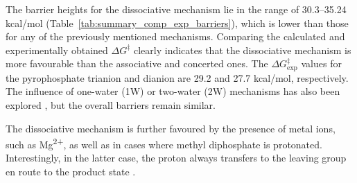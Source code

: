 The barrier heights for the dissociative mechanism lie in the range of 30.3--35.24 kcal/mol (Table~\ref{tab:summary_comp_exp_barriers}), which is lower than those for any of the previously mentioned mechanisms. Comparing the calculated and experimentally obtained $\Delta G^{\ddagger}$ clearly indicates that the dissociative mechanism is more favourable than the associative and concerted ones. The $\Delta G^{\ddagger}_{\text{exp}}$ values for the pyrophosphate trianion and dianion are 29.2 and 27.7 kcal/mol, respectively. The influence of one-water (1W) or two-water (2W) mechanisms has also been explored \citep{prasadAddressingOpenQuestions2013}, but the overall barriers remain similar.

The dissociative mechanism is further favoured by the presence of metal ions, such as Mg\textsuperscript{2+}, as well as in cases where methyl diphosphate is protonated. Interestingly, in the latter case, the proton always transfers to the leaving group en route to the product state \citep{klahnMechanismHydrolysisPhosphate2006}.

